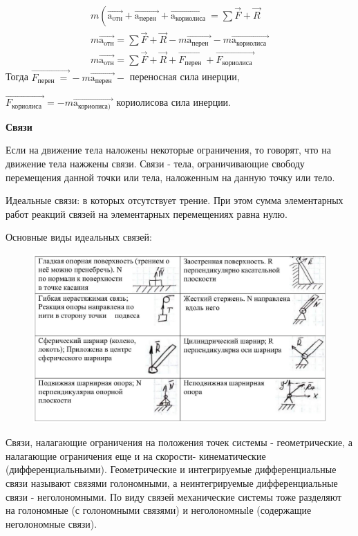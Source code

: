 $$
\begin{gathered}
m\left(\overrightarrow{\mathrm{a}_{\mathrm{oтн}}}+\overrightarrow{\mathrm{a}_{\text {перен }}}+\overrightarrow{\mathrm{a}_{\text {кориолиса }}}=\sum \vec{F}+\vec{R}\right. \\
m \overrightarrow{\mathrm{a}_{\mathrm{oтн}}}=\sum \vec{F}+\vec{R}-m \overrightarrow{\mathrm{a}_{\text {перен }}}-m \overrightarrow{\mathrm{a}_{\text {кориолиса }}} \\
m \overrightarrow{\mathrm{a}_{\mathrm{oтн}}}=\sum \vec{F}+\vec{R}+\overrightarrow{F_{\text {перен }}}+\overrightarrow{F_{\text {кориолиса }}}
\end{gathered}
$$
Тогда $\overrightarrow{F_{\text {перен }}=}-m \overrightarrow{\mathrm{a}_{\text {перен }}}-$ переносная сила инерции, 


$\overrightarrow{F_{\text {кориолиса }}}=-m \overrightarrow{\mathrm{a}_{\text {кориолиса) }}} $ кориолисова сила инерции.


\textbf{Связи}


Если на движение тела наложены некоторые ограничения, то говорят, что на движение тела нажжены связи. Связи - тела, ограничивающие свободу перемещения данной точки или тела, наложенным на данную точку или тело.

Идеальные связи: в которых отсутствует трение. При этом сумма элементарных работ реакций связей на элементарных перемещениях равна нулю.

Основные виды идеальных связей:

\begin{figure}[h!]
    \centering
    \includegraphics[width=1\textwidth]{2023_05_21_6e9b4e8657e82b213c6ag-09}
\end{figure}


Связи, налагающие ограничения на положения точек системы - геометрические, а налагающие ограничения еще и на скорости- кинематические (дифференциальньими). Геометрические и интегрируемые дифференциальные связи называют связями голономными, а неинтегрируемые дифференциальные связи - неголономными. По виду связей механические системы тоже разделяют на голономные (с голономными связями) и неголономныlе (содержащие неголономные связи).


